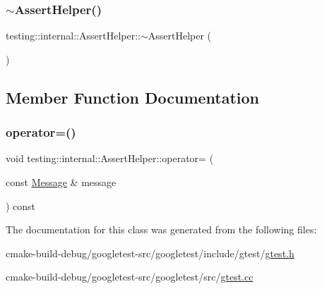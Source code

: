 \mbox{\label{classtesting_1_1internal_1_1AssertHelper_a51c640785d4ed4a0155cc9aa857d8931}} 
\subsubsection{\texorpdfstring{$\sim$AssertHelper()}{~AssertHelper()}}
{\footnotesize\ttfamily testing\+::internal\+::\+Assert\+Helper\+::$\sim$\+Assert\+Helper (\begin{DoxyParamCaption}{ }\end{DoxyParamCaption})}



\subsection{Member Function Documentation}
\mbox{\label{classtesting_1_1internal_1_1AssertHelper_a97bf22d786131ab7baa86b97a27aeb4d}} 
\subsubsection{\texorpdfstring{operator=()}{operator=()}}
{\footnotesize\ttfamily void testing\+::internal\+::\+Assert\+Helper\+::operator= (\begin{DoxyParamCaption}\item[{const \mbox{\hyperlink{classtesting_1_1Message}{Message}} \&}]{message }\end{DoxyParamCaption}) const}



The documentation for this class was generated from the following files\+:\begin{DoxyCompactItemize}
\item 
cmake-\/build-\/debug/googletest-\/src/googletest/include/gtest/\mbox{\hyperlink{gtest_8h}{gtest.\+h}}\item 
cmake-\/build-\/debug/googletest-\/src/googletest/src/\mbox{\hyperlink{gtest_8cc}{gtest.\+cc}}\end{DoxyCompactItemize}
